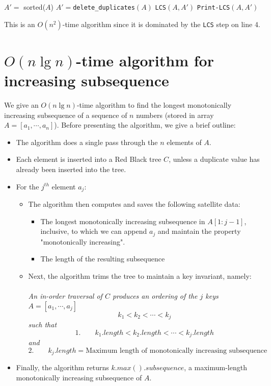\documentclass[paper=a4, fontsize=11pt]{scrartcl} %
\numberwithin{equation}{section} %
\numberwithin{figure}{section} %
\numberwithin{table}{section} %
\begin{document}
\begin{algorithmic}[1]
\State $A' =$ sorted($A$) 
\State $A' = $\texttt{delete\_duplicates}$(A)$ 
\State \texttt{LCS}$(A, A')$ 
\State \texttt{Print-LCS}$(A, A')$ 
\EndFunction
\end{algorithmic}

This is an $O(n^2)$-time algorithm since it is dominated by the \texttt{LCS} step on line 4.

\section{$O(n \lg n)$-time algorithm for increasing subsequence}

We give an $O(n \lg n)$-time algorithm to find the longest monotonically increasing subsequence of a sequence of $n$ numbers (stored in array $A = [a_1, \cdots, a_n]$). Before presenting the algorithm, we give a brief outline:
\begin{itemize}
\item The algorithm does a single pass through the $n$ elements of $A$.
\item Each element is inserted into a Red Black tree $C$,  unless a duplicate value has already been inserted into the tree.
\item For the $j^{th}$ element $a_j$:
\begin{itemize}
\item The algorithm then computes and saves the following satellite data:
\begin{itemize}
\item The longest monotonically increasing subsequence in $A[1:j-1]$, inclusive, to which we can append $a_j$ and maintain the property "monotonically increasing".
\item The length of the resulting subsequence
\end{itemize}
\item Next, the algorithm trims the tree to maintain a key invariant, namely:\\ \\
\emph{An in-order traversal of $C$ produces an ordering of the $j$ keys $A = [a_1, \cdots, a_j]$}
\[k_1 < k_2 < \cdots < k_j\]
\emph{such that}
\[1. \qquad{} k_1.length < k_2.length < \cdots < k_j.length\]
\emph{and}
\[2. \qquad{} k_j.length = \textrm{Maximum length of monotonically increasing subsequence}\]
\end{itemize}
\item Finally, the algorithm returns $k.max().subsequence$, a maximum-length monotonically increasing subsequence of $A$.
\end{itemize}
\end{document}
